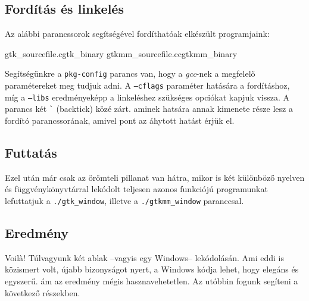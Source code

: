 \subsection{Fordítás és linkelés}
\label{sec:compilingandlinking}

Az alábbi parancssorok segítségével fordíthatóak elkészült programjaink:

\lstcompiles
{gtk\_sourcefile.c}{gtk\_binary}
{gtkmm\_sourcefile.cc}{gtkmm\_binary}

Segítségünkre a \texttt{pkg-config} parancs van, hogy a \textit{gcc}-nek a megfelelő paramétereket meg tudjuk adni. A \texttt{--cflags} paraméter hatására a fordításhoz, míg a \texttt{--libs} eredményeképp a linkeléshez szükséges opciókat kapjuk vissza. A parancs két \texttt{\`} (backtick) közé zárt. aminek hatsára annak kimenete része lesz a fordító parancssorának, amivel pont az áhytott hatást érjük el.

\subsection{Futtatás}

Ezel után már csak az örömteli pillanat van hátra, mikor is két különböző nyelven és függvénykönyvtárral lekódolt teljesen azonos funkciójú programunkat lefuttatjuk a \texttt{./gtk\_window}, illetve a \texttt{./gtkmm\_window} paranccsal.

\subsection{Eredmény}

Voil\`{a}! Túlvagyunk két ablak --vagyis egy Windows-- lekódolásán. Ami eddi is közismert volt, újabb bizonyságot nyert, a Windows kódja lehet, hogy elegáns és egyszerű. ám az eredmény mégis hasznavehetetlen. Az utóbbin fogunk segíteni a következő részekben.
